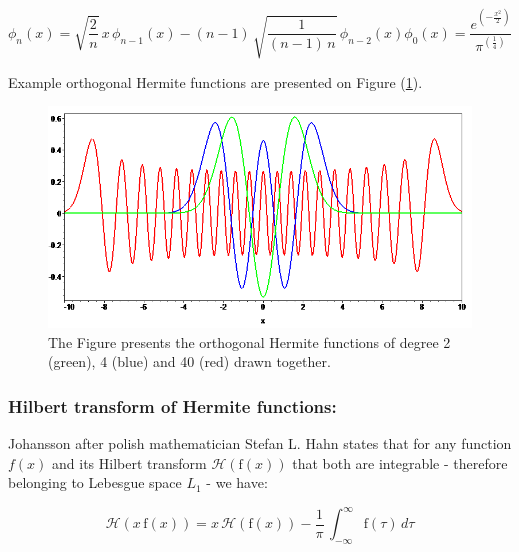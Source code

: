 \documentclass[12pt,twoside,a4paper]{article}
\numberwithin{equation}{subsection}
\numberwithin{figure}{subsection}
\begin{document}
\begin{subequations} \label{eq:hermite_recresult}
  \begin{equation}   \label{eq:hrr_weight}
    \phi_n (x) = \sqrt{\frac {2}{n}} \, x \, {\phi_{n - 1}}(x) - (n - 1) \, \sqrt{\frac {1} {(n - 1) \, n}} \, \phi_{n - 2}(x)
  \end{equation}
  \begin{equation}   \label{eq:hrr_iter}
    \phi_0 (x) = \frac {e^{( - \frac {x ^ 2} {2})}} {\pi ^{(\frac {1}{4})}}
  \end{equation}
\end{subequations}

Example orthogonal Hermite functions are presented on Figure (\ref{fig:her_plots}).

\begin{figure}
  \includegraphics[width=150mm]{img/her_plots.png}
  \caption{ The Figure presents the orthogonal Hermite functions of degree 2 (green), 4 (blue) and 40 (red) drawn together. } \label{fig:her_plots}
\end{figure}
 
\subsubsection*{Hilbert transform of Hermite functions:}

Johansson after polish mathematician Stefan L. Hahn \cite{hahn_hilbert} states that for any function $f(x)$ and its Hilbert transform  $\mathcal{H}(\mathrm{f}(x))$ that both are integrable - therefore belonging to Lebesgue space $ L_1 $ - we have:

\begin{equation} \label{eg:hermite_hproperty}
  \mathcal{H}(x \, \mathrm{f}(x)) = x \, \mathcal{H}(\mathrm{f}(x)) 
    - \frac {1}{\pi } \, \int_{ - \infty } ^ {\infty}\mathrm{f}(\tau ) \, d\tau 
\end{equation}
\end{document}
